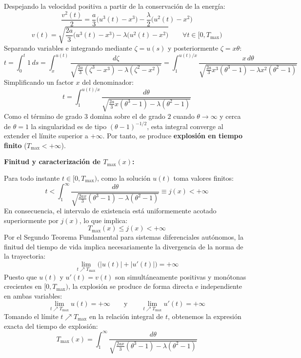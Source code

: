 {\begin{itemize}
        Despejando la velocidad positiva a partir de la conservación de la energía:
        \[
            \frac{v^2(t)}{2} = \frac{a}{3}\bigl(u^3(t) - x^3\bigr) - \frac{\lambda}{2}\bigl(u^2(t) - x^2\bigr)
        \]
        \[
            v(t) = \sqrt{\frac{2a}{3}\bigl(u^3(t) - x^3\bigr) - \lambda\bigl(u^2(t) - x^2\bigr)} \qquad \forall t \in [0, T_{\max})
        \]
        Separando variables e integrando mediante $\zeta = u(s)$ y posteriormente $\zeta = x\theta$:
        \[
            t = \int_0^t 1\, ds = \int_x^{u(t)} \frac{d\zeta}{\sqrt{\frac{2a}{3}(\zeta^3 - x^3) - \lambda(\zeta^2 - x^2)}} = \int_1^{u(t)/x} \frac{x\, d\theta}{\sqrt{\frac{2a}{3}x^3(\theta^3 - 1) - \lambda x^2(\theta^2 - 1)}}
        \]
        Simplificando un factor $x$ del denominador:
        \[
            t = \int_1^{u(t)/x} \frac{d\theta}{\sqrt{\frac{2a}{3}x(\theta^3 - 1) - \lambda(\theta^2 - 1)}}
        \]
        Como el término de grado $3$ domina sobre el de grado $2$ cuando $\theta \to \infty$ y cerca de $\theta = 1$ la singularidad es de tipo $(\theta - 1)^{-1/2}$, esta integral converge al extender el límite superior a $+\infty$. Por tanto, se produce \textbf{explosión en tiempo finito} ($T_{\max} < +\infty$).

        \medskip

        \textbf{Finitud y caracterización de $T_{\max}(x)$:}

        Para todo instante $t \in [0, T_{\max})$, como la solución $u(t)$ toma valores finitos:
        \[
            t < \int_1^\infty \frac{d\theta}{\sqrt{\frac{2ax}{3}(\theta^3 - 1) - \lambda(\theta^2 - 1)}} \equiv j(x) < +\infty
        \]
        En consecuencia, el intervalo de existencia está uniformemente acotado superiormente por $j(x)$, lo que implica:
        \[
            T_{\max}(x) \leq j(x) < +\infty
        \]
        Por el Segundo Teorema Fundamental para sistemas diferenciales autónomos, la finitud del tiempo de vida implica necesariamente la divergencia de la norma de la trayectoria:
        \[
            \lim_{t \nearrow T_{\max}} \bigl( |u(t)| + |u'(t)| \bigr) = +\infty
        \]
        Puesto que $u(t)$ y $u'(t) = v(t)$ son simultáneamente positivas y monótonas crecientes en $[0, T_{\max})$, la explosión se produce de forma directa e independiente en ambas variables:
        \[
            \lim_{t \nearrow T_{\max}} u(t) = +\infty \qquad \text{y} \qquad \lim_{t \nearrow T_{\max}} u'(t) = +\infty
        \]
        Tomando el límite $t \nearrow T_{\max}$ en la relación integral de $t$, obtenemos la expresión exacta del tiempo de explosión:
        \[
            T_{\max}(x) = \int_1^\infty \frac{d\theta}{\sqrt{\frac{2ax}{3}(\theta^3 - 1) - \lambda(\theta^2 - 1)}}
        \]


\end{itemize}}
